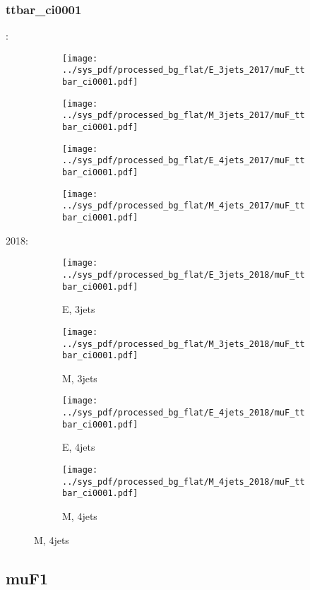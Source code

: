 \documentclass{beamer}
\begin{document}
\begin{frame}
\frametitle{ttbar_ci0001}
\fontsize{5}{1}:
\begin{figure}
\centering
\begin{subfigure}[b]{0.24\textwidth}
\texttt{[image: ../sys\_pdf/processed\_bg\_flat/E\_3jets\_2017/muF\_ttbar\_ci0001.pdf]}
\end{subfigure}
\begin{subfigure}[b]{0.24\textwidth}
\texttt{[image: ../sys\_pdf/processed\_bg\_flat/M\_3jets\_2017/muF\_ttbar\_ci0001.pdf]}
\end{subfigure}
\begin{subfigure}[b]{0.24\textwidth}
\texttt{[image: ../sys\_pdf/processed\_bg\_flat/E\_4jets\_2017/muF\_ttbar\_ci0001.pdf]}
\end{subfigure}
\begin{subfigure}[b]{0.24\textwidth}
\texttt{[image: ../sys\_pdf/processed\_bg\_flat/M\_4jets\_2017/muF\_ttbar\_ci0001.pdf]}
\end{subfigure}
\end{figure}
2018:
\begin{figure}
\centering
\begin{subfigure}[b]{0.24\textwidth}
\texttt{[image: ../sys\_pdf/processed\_bg\_flat/E\_3jets\_2018/muF\_ttbar\_ci0001.pdf]}
\captionsetup{font=tiny}
\caption{E, 3jets}
\end{subfigure}
\begin{subfigure}[b]{0.24\textwidth}
\texttt{[image: ../sys\_pdf/processed\_bg\_flat/M\_3jets\_2018/muF\_ttbar\_ci0001.pdf]}
\captionsetup{font=tiny}
\caption{M, 3jets}
\end{subfigure}
\begin{subfigure}[b]{0.24\textwidth}
\texttt{[image: ../sys\_pdf/processed\_bg\_flat/E\_4jets\_2018/muF\_ttbar\_ci0001.pdf]}
\captionsetup{font=tiny}
\caption{E, 4jets}
\end{subfigure}
\begin{subfigure}[b]{0.24\textwidth}
\texttt{[image: ../sys\_pdf/processed\_bg\_flat/M\_4jets\_2018/muF\_ttbar\_ci0001.pdf]}
\captionsetup{font=tiny}
\caption{M, 4jets}
\end{subfigure}
\end{figure}
\end{frame}


\subsection{muF1}
\end{document}
